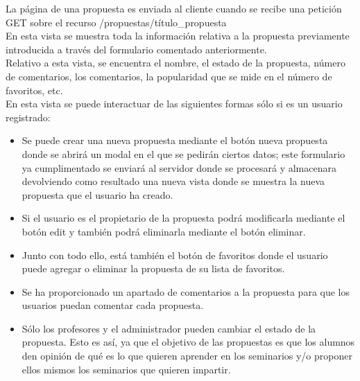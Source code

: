 La página de una propuesta es enviada al cliente cuando se recibe una petición GET sobre el recurso /propuestas/{título\_propuesta}\\
En esta vista se muestra toda la información relativa a la propuesta previamente introducida a través del formulario comentado anteriormente.\\
Relativo a esta vista, se encuentra el nombre, el estado de la propuesta, número de comentarios, los comentarios, la popularidad que se mide en el número de favoritos, etc.\\
En esta vista se puede interactuar de las siguientes formas sólo si es un usuario registrado:
\begin{itemize}
\item Se puede crear una nueva propuesta mediante el botón nueva propuesta donde se abrirá un modal en el que se pedirán ciertos datos; este formulario ya cumplimentado se enviará al servidor donde se procesará y almacenara devolviendo como resultado una nueva vista donde se muestra la nueva propuesta que el usuario ha creado.
\item Si el usuario es el propietario de la propuesta podrá modificarla mediante el botón edit y también podrá eliminarla mediante el botón eliminar.
\item Junto con todo ello, está también el botón de favoritos donde el usuario puede agregar o eliminar la propuesta de su lista de favoritos.  
\item Se ha proporcionado un apartado de comentarios a la propuesta para que los usuarios puedan comentar cada propuesta.
\item Sólo los profesores y el administrador pueden cambiar el estado de la propuesta. Esto es así, ya que el objetivo de las propuestas es que los alumnos den opinión de qué es lo que quieren aprender en los seminarios y/o proponer ellos mismos los seminarios que quieren impartir.
\end{itemize}

